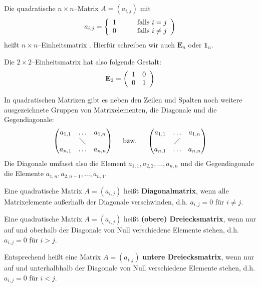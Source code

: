 \begin{beispiel}\label{einheitsmatrix} Die quadratische $n \times n$--Matrix $A = \left(a_{i,j}\right)$ mit
   	$$ a_{i,j} = \left\{ \begin{array} {l c l}
 	1 & \quad & \textrm{falls } i = j \\ 0 & & \textrm{falls } i \neq j
	 \end{array} \right) $$
heißt $n \times n$--Einheitsmatrix . Hierfür schreiben wir auch $\mathbf{E}_n$ oder 
$\textbf{1}_n$.

Die $2 \times 2$--Einheitsmatrix hat also folgende Gestalt:
  	$$ \mathbf{E}_2 = \left( \begin{array}{ l  l }
	1 & 0 \\ 0 & 1 \end{array} \right) $$
\end{beispiel}

In quadratischen Matrizen gibt es neben den Zeilen und Spalten noch weitere 
ausgezeichnete Gruppen von Matrixelementen, die Diagonale und die Gegendiagonale:
  	$$ \left( \begin{matrix} a_{1,1}  & \ldots & a_{1,n} \\
 	& \diagdown  &  \\
	a_{n,1}  & \ldots  & a_{n,n} \end{matrix} \right)
  	\quad \textrm{ bzw. } \quad
 	\left( \begin{matrix} a_{1,1} & \ldots  & a_{1,n} \\
	& \diagup  &  \\
	a_{n,1} & \ldots   & a_{n,n} \end{matrix} \right) $$
Die Diagonale umfasst also die Element $a_{1,1}, a_{2,2}, \ldots , a_{n,n}$ und die 
Gegendiagonale die Elemente $a_{1,n}, a_{2, n-1}, \ldots , a_{n, 1}$.

\begin{definition} Eine quadratische Matrix $A = \left( a_{i,j} \right)$ heißt 
\textbf{Diagonalmatrix}, wenn alle Matrixelemente 
außerhalb der Diagonale verschwinden, d.h. $a_{i,j} = 0$ für $i \neq j$. 

Eine quadratische Matrix  $A = \left( a_{i,j} \right)$ heißt 
\textbf{(obere) Dreiecksmatrix}, wenn nur auf und oberhalb 
der Diagonale von Null verschiedene Elemente stehen, d.h. $a_{i,j} = 0$ für 
$i > j$.

Entsprechend heißt eine Matrix  $A = \left( a_{i,j} \right)$ 
\textbf{untere Dreiecksmatrix}, wenn nur auf und unterhalbhalb 
der Diagonale von Null verschiedene Elemente stehen, d.h. $a_{i,j} = 0$ für 
$i < j$.
\end{definition}

